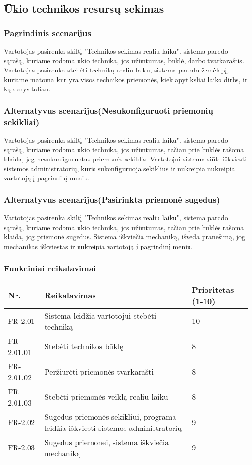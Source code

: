 \documentclass[oneside]{VUMIFPSkursinis}
\begin{document}
\subsection{Ūkio technikos resursų sekimas}
\subsubsection{Pagrindinis scenarijus}
	Vartotojas pasirenka skiltį "Technikos sekimas realiu laiku", sistema parodo sąrašą, kuriame rodoma ūkio technika, jos užimtumas, būklė, darbo tvarkaraštis. Vartotojas pasirenka stebėti techniką realiu laiku, sistema parodo žemėlapį, kuriame matoma kur yra visos technikos priemonės, kiek apytiksliai laiko dirbs, ir ką darys toliau.
\subsubsection{Alternatyvus scenarijus(Nesukonfiguruoti priemonių sekikliai)}
	Vartotojas pasirenka skiltį "Technikos sekimas realiu laiku", sistema parodo sąrašą, kuriame rodoma ūkio technika, jos užimtumas, tačiau prie būklės rašoma klaida, jog nesukonfiguruotas priemonės sekiklis. Vartotojui sistema siūlo iškviesti sistemos administratorių, kuris sukonfiguruoja sekiklius ir nukreipia nukreipia vartotoją į pagrindinį meniu.
\subsubsection{Alternatyvus scenarijus(Pasirinkta priemonė sugedus)}
	Vartotojas pasirenka skiltį "Technikos sekimas realiu laiku", sistema parodo sąrašą, kuriame rodoma ūkio technika, jos užimtumas, tačiau prie būklės rašoma klaida, jog priemonė sugedus. Sistema iškviečia mechaniką, išveda pranešimą, jog mechanikas iškviestas ir nukreipia vartotoją į pagrindinį meniu.
\subsubsection{Funkciniai reikalavimai}
\begin{table}[htbp]
	\begin{tabularx}{1\textwidth}{ |P{2.5cm}|X|P{3cm }| }  \hline
           	Nr. & Reikalavimas &  Prioritetas (1-10)  \\   \hline 
         		FR-2.01 & Sistema leidžia vartotojui stebėti techniką & 10  \\   \hline
		FR-2.01.01 & Stebėti technikos būklę & 8 \\ \hline
		FR-2.01.02 & Peržiūrėti priemonės tvarkaraštį & 8 \\ \hline
		FR-2.01.03 & Stebėti priemonės veiklą realiu laiku & 8 \\ \hline
        		FR-2.02 & Sugedus priemonės sekikliui, programa leidžia iškviesti sistemos administratorių & 9   \\   \hline
			FR-2.03 & Sugedus priemonei, sistema iškviečia mechaniką & 9 \\ \hline
	\end{tabularx}
\end{table}
\end{document}
